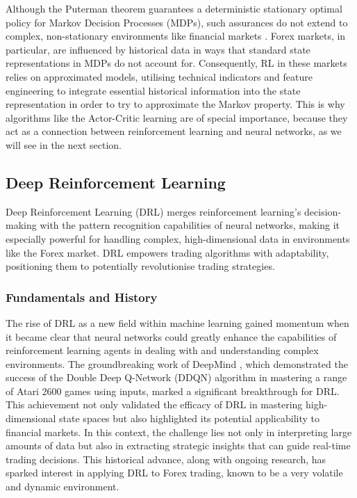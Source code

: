 

Although the Puterman theorem guarantees a deterministic stationary optimal policy for Markov Decision Processes (MDPs), such assurances do not extend to complex, non-stationary environments like financial markets \cite{sutton_reinforcement_2018}. Forex markets, in particular, are influenced by historical data in ways that standard state representations in MDPs do not account for. Consequently, RL in these markets relies on approximated models, utilising technical indicators and feature engineering to integrate essential historical information into the state representation in order to try to approximate the Markov property. This is why algorithms like the Actor-Critic learning are of special importance, because they act as a connection between reinforcement learning and neural networks, as we will see in the next section.

\subsection{Deep Reinforcement Learning}

Deep Reinforcement Learning (DRL) merges reinforcement learning's decision-making with the pattern recognition capabilities of neural networks, making it especially powerful for handling complex, high-dimensional data in environments like the Forex market. DRL empowers trading algorithms with adaptability, positioning them to potentially revolutionise trading strategies.

\subsubsection{Fundamentals and History}

The rise of DRL as a new field within machine learning gained momentum when it became clear that neural networks could greatly enhance the capabilities of reinforcement learning agents in dealing with and understanding complex environments. The groundbreaking work of DeepMind \cite{van_hasselt_deep_2016}, which demonstrated the success of the Double Deep Q-Network (DDQN) algorithm in mastering a range of Atari 2600 games using inputs, marked a significant breakthrough for DRL. This achievement not only validated the efficacy of DRL in mastering high-dimensional state spaces but also highlighted its potential applicability to financial markets. In this context, the challenge lies not only in interpreting large amounts of data but also in extracting strategic insights that can guide real-time trading decisions. This historical advance, along with ongoing research, has sparked interest in applying DRL to Forex trading, known to be a very volatile and dynamic environment.

